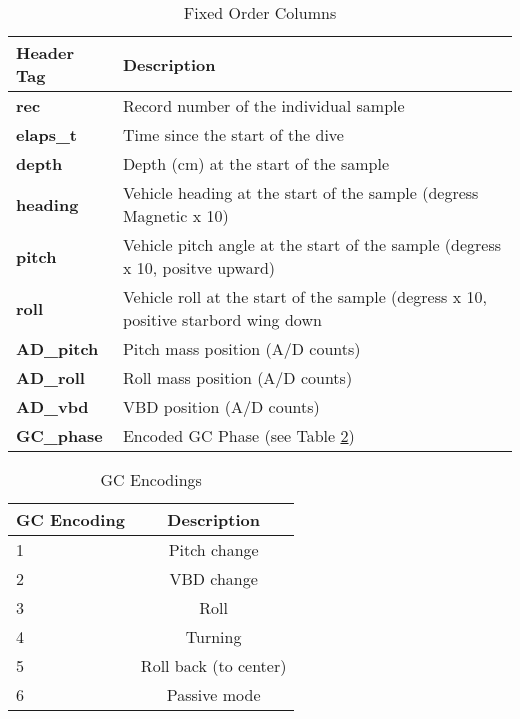 \documentclass[12pt,english,twoside]{book}
\providecommand{\tabularnewline}{\\}
\begin{document}
%
\begin{table}
\begin{centering}\begin{tabular}{|l|p{4.5in}|}
\hline 
\textbf{Header Tag} &
\textbf{Description} \tabularnewline
\hline 
\textbf{rec} &
Record number of the individual sample \tabularnewline
\hline 
\textbf{elaps\_t} &
Time since the start of the dive \tabularnewline
\hline 
\textbf{depth} &
Depth (cm) at the start of the sample \tabularnewline
\hline 
\textbf{heading} &
Vehicle heading at the start of the sample (degress Magnetic x 10) \tabularnewline
\hline 
\textbf{pitch} &
Vehicle pitch angle at the start of the sample (degress x 10, positve
upward) \tabularnewline
\hline 
\textbf{roll} &
Vehicle roll at the start of the sample (degress x 10, positive starbord
wing down \tabularnewline
\hline 
\textbf{AD\_pitch} &
Pitch mass position (A/D counts) \tabularnewline
\hline 
\textbf{AD\_roll} &
Roll mass position (A/D counts) \tabularnewline
\hline 
\textbf{AD\_vbd} &
VBD position (A/D counts) \tabularnewline
\hline 
\textbf{GC\_phase} &
Encoded GC Phase (see Table \ref{GCEncoding}) \tabularnewline
\hline
\end{tabular}\par\end{centering}


\caption{Fixed Order Columns}

\label{FixedOrderColumns} 
\end{table}


%
\begin{table}
\begin{centering}\begin{tabular}{|l|c|}
\hline 
\textbf{GC Encoding} &
\textbf{Description} \tabularnewline
\hline 
1 &
Pitch change \tabularnewline
\hline 
2 &
VBD change \tabularnewline
\hline 
3 &
Roll \tabularnewline
\hline 
4 &
Turning \tabularnewline
\hline 
5 &
Roll back (to center) \tabularnewline
\hline 
6 &
Passive mode \tabularnewline
\hline
\end{tabular}\par\end{centering}


\caption{GC Encodings}

\label{GCEncoding} 
\end{table}
\end{document}
